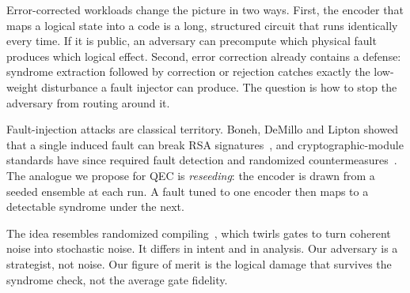 \documentclass{report}
\theoremstyle{plain}
\theoremstyle{definition}
\theoremstyle{remark}
\begin{document}
Error-corrected workloads change the picture in two ways. First, the encoder that maps a logical state into a code is a long, structured circuit that runs identically every time. If it is public, an adversary can precompute which physical fault produces which logical effect. Second, error correction already contains a defense: syndrome extraction followed by correction or rejection catches exactly the low-weight disturbance a fault injector can produce. The question is how to stop the adversary from routing around it.

Fault-injection attacks are classical territory. Boneh, DeMillo and Lipton showed that a single induced fault can break RSA signatures~\cite{boneh1997faults}, and cryptographic-module standards have since required fault detection and randomized countermeasures~\cite{nist2019fips1403}. The analogue we propose for QEC is \emph{reseeding}: the encoder is drawn from a seeded ensemble at each run. A fault tuned to one encoder then maps to a detectable syndrome under the next.

The idea resembles randomized compiling~\cite{wallman2016randomizedcompiling}, which twirls gates to turn coherent noise into stochastic noise. It differs in intent and in analysis. Our adversary is a strategist, not noise. Our figure of merit is the logical damage that survives the syndrome check, not the average gate fidelity.
\end{document}
